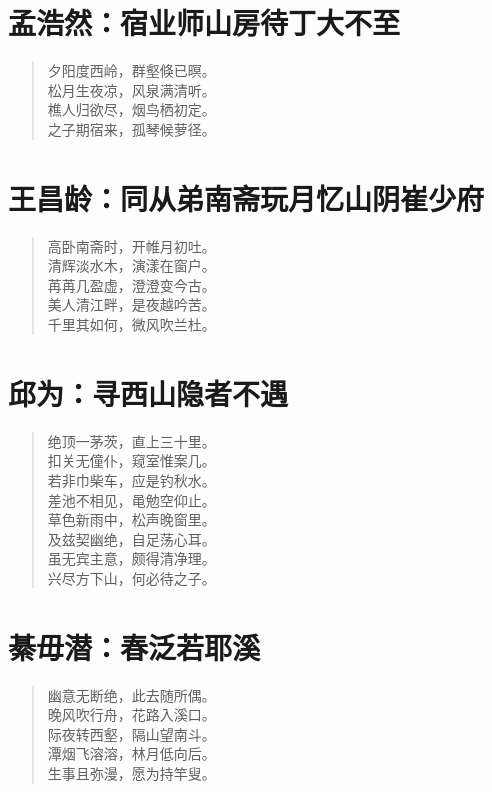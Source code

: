 \documentclass[12pt,oneside]{book}
\newenvironment{shici}{%
\begin{verse}\centering\yanti\large\hspace{12pt}}{\end{verse}}
\begin{document}
\begin{common-format}
\chapter{孟浩然：宿业师山房待丁大不至}
\begin{shici}
夕阳度西岭，群壑倏已暝。\\
松月生夜凉，风泉满清听。\\
樵人归欲尽，烟鸟栖初定。\\
之子期宿来，孤琴候萝径。
\end{shici}

\chapter{王昌龄：同从弟南斋玩月忆山阴崔少府}
\begin{shici}
高卧南斋时，开帷月初吐。\\
清辉淡水木，演漾在窗户。\\
苒苒几盈虚，澄澄变今古。\\
美人清江畔，是夜越吟苦。\\
千里其如何，微风吹兰杜。
\end{shici}

\chapter{邱为：寻西山隐者不遇}
\begin{shici}
绝顶一茅茨，直上三十里。\\
扣关无僮仆，窥室惟案几。\\
若非巾柴车，应是钓秋水。\\
差池不相见，黾勉空仰止。\\
草色新雨中，松声晚窗里。\\
及兹契幽绝，自足荡心耳。\\
虽无宾主意，颇得清净理。\\
兴尽方下山，何必待之子。
\end{shici}

\chapter{綦毋潜：春泛若耶溪}
\begin{shici}
幽意无断绝，此去随所偶。\\
晚风吹行舟，花路入溪口。\\
际夜转西壑，隔山望南斗。\\
潭烟飞溶溶，林月低向后。\\
生事且弥漫，愿为持竿叟。
\end{shici}


\end{common-format}
\end{document}

